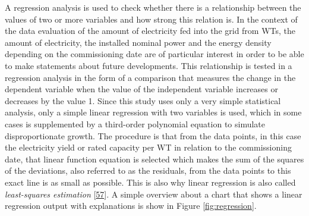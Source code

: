\documentclass[a4paper,11pt]{article}
\begin{document}
A regression analysis is used to check whether there is a relationship between the values of two or more variables and how strong this relation is. In the context of the data evaluation of the amount of electricity fed into the grid from WTs, the amount of electricity, the installed nominal power and the energy density depending on the commissioning date are of particular interest in order to be able to make statements about future developments. This relationship is tested in a regression analysis in the form of a comparison that measures the change in the dependent variable when the value of the independent variable increases or decreases by the value 1. Since this study uses only a very simple statistical analysis, only a simple linear regression with two variables is used, which in some cases is supplemented by a third-order polynomial equation to simulate disproportionate growth. The procedure is that from the data points, in this case the electricity yield or rated capacity per WT in relation to the commissioning date, that linear function equation is selected which makes the sum of the squares of the deviations, also referred to as the residuals, from the data points to this exact line is as small as possible. This is also why linear regression is also called \emph{least-squares estimation} {[}\protect\hyperlink{ref-NormanMatloff.2017}{57}{]}. A simple overview about a chart that shows a linear regression output with explanations is show in Figure \ref{fig:regression}.
\end{document}
